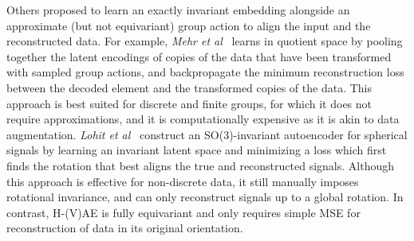 Others proposed to learn an exactly invariant embedding alongside an approximate (but not equivariant) group action to
align the input and the reconstructed data. For example, {\em Mehr et al}~\cite{mehr_manifold_2018} learns in
quotient space by pooling together the latent encodings of copies of the data that have been transformed with sampled
group actions, and backpropagate the minimum reconstruction loss between the decoded element and the transformed copies
of the data. This approach is best suited for discrete and finite groups, for which it does not require approximations,
and it is computationally expensive as it is akin to data augmentation. {\em Lohit et
al}~\cite{lohit_rotation-invariant_2020} construct an SO(3)-invariant autoencoder for spherical signals by learning an
invariant latent space and minimizing a loss which first finds the rotation that best aligns the true and reconstructed
signals. Although this approach is effective for non-discrete data, it still manually imposes rotational invariance, and
can only reconstruct signals up to a global rotation. In contrast, H-(V)AE is fully equivariant and only requires simple
MSE for reconstruction of data in its original orientation.


